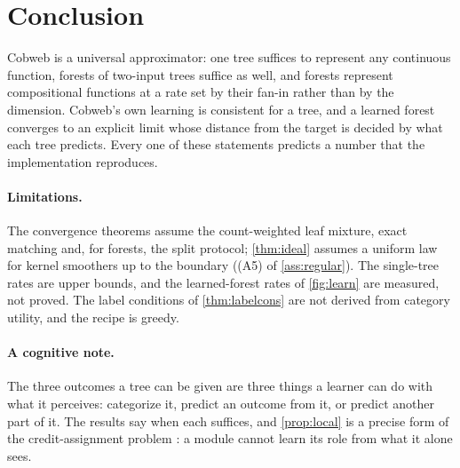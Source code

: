 \section{Conclusion}\label{sec:conclusion}

Cobweb is a universal approximator: one tree suffices to represent any continuous
function, forests of two-input trees suffice as well, and forests represent compositional
functions at a rate set by their fan-in rather than by the dimension.  Cobweb's own
learning is consistent for a tree, and a learned forest converges to an explicit limit
whose distance from the target is decided by what each tree predicts.  Every one of these
statements predicts a number that the implementation reproduces.

\paragraph{Limitations.}
The convergence theorems assume the count-weighted leaf mixture, exact matching and, for
forests, the split protocol; \cref{thm:ideal} assumes a uniform law for kernel smoothers up
to the boundary ((A5) of \cref{ass:regular}).  The single-tree rates are upper bounds, and
the learned-forest rates of \cref{fig:learn} are measured, not proved.  The label conditions
of \cref{thm:labelcons} are not derived from category utility, and the recipe is greedy.

\paragraph{A cognitive note.}
The three outcomes a tree can be given are three things a learner can do with what it
perceives: categorize it, predict an outcome from it, or predict another part of it.  The
results say when each suffices, and \cref{prop:local} is a precise form of the
credit-assignment problem \citep{minsky1961}: a module cannot learn its role from what it
alone sees.

\appendix
{}
